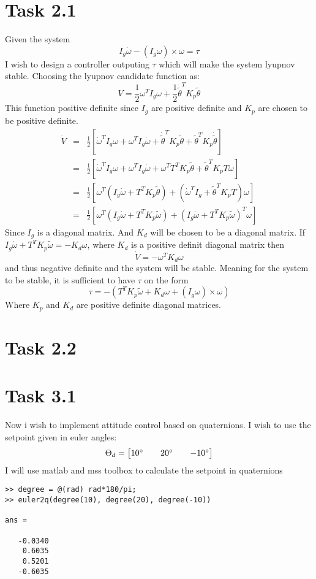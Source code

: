 \documentclass[11pt]{article}
\begin{document}
\section{Task 2.1}
Given the system
\[I_g \dot \omega - (I_g \omega) \times \omega = \tau \]
I wish to design a controller outputing $\tau$ which will make the system lyupnov stable. Choosing the lyupnov candidate function as:
\[V = \frac{1}{2} \omega^T I_g \omega + \frac{1}{2} \dot \tilde \theta^T K_p \tilde \theta \]
This function  positive definite since $I_g$ are positive definite and $K_p$ are chosen to be positive definite.
\begin{eqnarray*}
\dot V &=& \frac{1}{2} [ \dot \omega^T I_g \omega + \omega^T I_g \dot \omega + \dot \tilde \theta^T K_p \tilde \theta + \tilde \theta^T K_p \dot \tilde \theta ] \\
&=& \frac{1}{2} [ \dot \omega^T I_g \omega + \omega^T I_g \dot \omega + \omega^T T^T K_p \tilde \theta + \tilde \theta^T K_p T \omega ] \\
&=& \frac{1}{2} [\omega^T ( I_g \dot \omega + T^T K_p \tilde \theta) + (\dot \omega^T I_g + \tilde \theta^T K_p T) \omega ] \\
&=& \frac{1}{2} [\omega^T (I_g \dot \omega + T^T K_p \tilde \omega) + (I_g \dot \omega + T^T K_p \tilde \omega)^T \omega ] 
\end{eqnarray*}
Since $I_g$ is a diagonal matrix. And $K_d$ will be chosen to be a diagonal matrix. If $I_g \dot \omega + T^T K_p \tilde \omega = - K_d \omega$, where $K_d$ is a positive definit diagonal matrix then 
\[\dot V = - \omega^T K_d \omega \]
and thus negative definite and the system will be stable. Meaning for the system to be stable, it is sufficient to have $\tau$ on the form
\[ \tau = -(T^T K_p \tilde \omega + K_d \omega + (I_g \omega) \times \omega) \]
Where $K_p$ and $K_d$ are positive definite diagonal matrices.



\section{Task 2.2}

\section{Task 3.1}
Now i wish to implement attitude control based on quaternions. I wish to use the setpoint given in euler angles:
\[\Theta_d = \begin{bmatrix} 10\degree && 20\degree && -10\degree \end{bmatrix} \]
I will use matlab and mss toolbox to calculate the setpoint in quaternions
\begin{lstlisting}[frame=single]
>> degree = @(rad) rad*180/pi;
>> euler2q(degree(10), degree(20), degree(-10))

ans =

   -0.0340
    0.6035
    0.5201
   -0.6035
\end{lstlisting}
\end{document}
